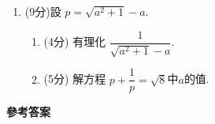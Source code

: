 \documentclass[12pt]{article}
\begin{document}
\begin{enumerate}
        \hrulefill

        \hrulefill

        \hrulefill

        \hrulefill

        \hrulefill

        \hrulefill
        \item (9分)設 $p=\sqrt{a^2+1}-a$.\begin{enumerate}
            \item (4分) 有理化 $\dfrac{1}{\sqrt{a^2+1}-a}$.
            \item (5分) 解方程 $p+\dfrac{1}{p}=\sqrt{8}$中$a$的值.
        \end{enumerate}

        \hrulefill

        \hrulefill

        \hrulefill

        \hrulefill

        \hrulefill

        \hrulefill

        \hrulefill

        \hrulefill

        \hrulefill

        \hrulefill

        \hrulefill

        \hrulefill

        \hrulefill

        \hrulefill

        \hrulefill

        \hrulefill

        \hrulefill

        \hrulefill

        \hrulefill

        \hrulefill

        \hrulefill

        \hrulefill

        \hrulefill

        \hrulefill
    \end{enumerate}

    \newpage

    \begin{center}
        \textbf{參考答案}
    \end{center}
\end{document}
